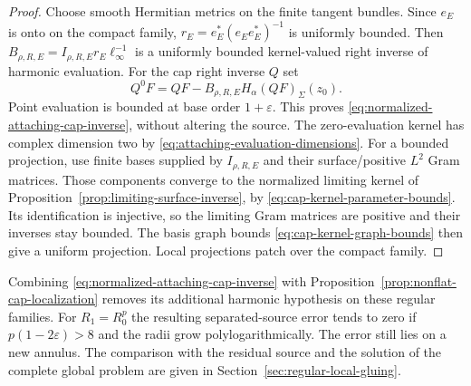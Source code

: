 \documentclass[11pt]{amsart}
\theoremstyle{definition}
\theoremstyle{remark}
\theoremstyle{plain}
\begin{document}
\begin{proof}
Choose smooth Hermitian metrics on the finite tangent bundles.
Since $e_E$ is onto on the compact family,
$r_E=e_E^*(e_Ee_E^*)^{-1}$ is uniformly bounded.
Then
$B_{\rho,R,E}=I_{\rho,R,E}r_E\ell_\infty^{-1}$
is a uniformly bounded kernel-valued right inverse of harmonic
evaluation. For the cap right inverse $Q$ set
\[
 Q^0F=QF-B_{\rho,R,E}H_\alpha(QF)_\Sigma(z_0).
\]
Point evaluation is bounded at base order $1+\varepsilon$.
This proves \eqref{eq:normalized-attaching-cap-inverse}, without
altering the source. The zero-evaluation kernel has complex
dimension two by \eqref{eq:attaching-evaluation-dimensions}.
For a bounded projection, use finite bases supplied by
$I_{\rho,R,E}$ and their surface/positive $L^2$ Gram matrices.
Those components converge to the normalized limiting kernel
of Proposition~\ref{prop:limiting-surface-inverse}, by
\eqref{eq:cap-kernel-parameter-bounds}. Its identification is
injective, so the limiting Gram matrices are positive and
their inverses stay bounded. The basis graph bounds
\eqref{eq:cap-kernel-graph-bounds} then give a uniform
projection. Local projections patch over the compact family.
\end{proof}

Combining \eqref{eq:normalized-attaching-cap-inverse} with
Proposition~\ref{prop:nonflat-cap-localization} removes its
additional harmonic hypothesis on these regular families.
For $R_1=R_0^p$ the resulting separated-source error tends
to zero if $p(1-2\varepsilon)>8$ and the radii grow
polylogarithmically. The error still lies on a new annulus.
The comparison with the residual source and the solution of the
complete global problem are given in Section~\ref{sec:regular-local-gluing}.
\end{document}
